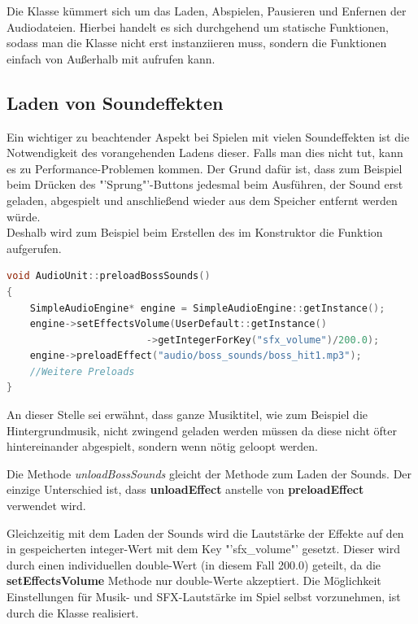 \label{sec:4_Audiounit}
Die Klasse  kümmert sich um das Laden, Abspielen, Pausieren und Enfernen der Audiodateien. Hierbei handelt es sich durchgehend um statische Funktionen, sodass man die Klasse nicht erst instanziieren muss, sondern die Funktionen einfach von Außerhalb mit  aufrufen kann.

\subsection{Laden von Soundeffekten}
Ein wichtiger zu beachtender Aspekt bei Spielen mit vielen Soundeffekten ist die Notwendigkeit des vorangehenden Ladens dieser. Falls man dies nicht tut, kann es zu Performance-Problemen kommen. Der Grund dafür ist, dass zum Beispiel beim Drücken des "'Sprung"'-Buttons jedesmal beim Ausführen, der Sound erst geladen, abgespielt und anschließend wieder aus dem Speicher entfernt werden würde. \\Deshalb wird zum Beispiel beim Erstellen des  im Konstruktor die Funktion  aufgerufen.

\begin{lstlisting}[label=lst:preloadBossSounds,
				   language=C++,
				   firstnumber=30,
				   caption=BossLevel-Sounds laden ( AudioUnit.cpp )]
void AudioUnit::preloadBossSounds()
{
	SimpleAudioEngine* engine = SimpleAudioEngine::getInstance();
	engine->setEffectsVolume(UserDefault::getInstance()
						->getIntegerForKey("sfx_volume")/200.0);
	engine->preloadEffect("audio/boss_sounds/boss_hit1.mp3");
	//Weitere Preloads
}
\end{lstlisting}

An dieser Stelle sei erwähnt, dass ganze Musiktitel, wie zum Beispiel die Hintergrundmusik, nicht zwingend geladen werden müssen da diese nicht öfter hintereinander abgespielt, sondern wenn nötig geloopt werden. 

Die Methode \textit{unloadBossSounds} gleicht der Methode zum Laden der Sounds. Der einzige Unterschied ist, dass \textbf{unloadEffect} anstelle von \textbf{preloadEffect} verwendet wird.

Gleichzeitig mit dem Laden der Sounds wird die Lautstärke der Effekte auf den in  gespeicherten integer-Wert mit dem Key "'sfx\_volume"' gesetzt. Dieser wird durch einen individuellen double-Wert (in diesem Fall 200.0) geteilt, da die \textbf{setEffectsVolume} Methode nur double-Werte akzeptiert. Die Möglichkeit Einstellungen für Musik- und SFX-Lautstärke im Spiel selbst vorzunehmen, ist durch die Klasse  realisiert. 

